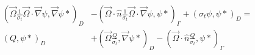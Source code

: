 \begin{align*}
        \left ( \vec{\Omega}\frac{1}{\sigma_t}\vec{\Omega}\cdot \vec{\nabla}\psi, \vec{\nabla}\psi* \right)_D &-     \left ( \vec{\Omega}\cdot \hat{n} \frac{1}{\sigma_t}\vec{\Omega} \cdot \vec{\nabla} \psi,\psi* \right)_{\Gamma} + \left ( \sigma_t \psi, \psi* \right )_D = \\
        \left ( Q, \psi* \right)_D &+ \left ( \vec{\Omega} \frac{Q}{\sigma_t}, \vec{\nabla}\psi* \right)_D - \left ( \vec{\Omega}\cdot \hat{n} \frac{Q}{\sigma_t}, \psi* \right)_{\Gamma} 
\end{align*}

